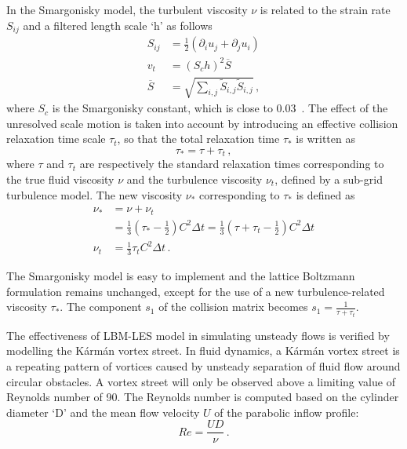 In the Smargonisky model, the turbulent viscosity $\nu$ is related to the 
strain 
rate $S_{ij}$ and a filtered length scale `h' as follows
%
\begin{align}
S_{ij} & = \frac{1}{2}(\partial_i u_j + \partial_j u_i) \\
\mathit{v}_{\mathit{t}} & = (\mathit{S}_{c}\mathit{h})^{2}\overline{S} \\
\overline{S} & =  
\sqrt{\sum\limits_{\mathit{i,j}}{\tilde{S}_{\mathit{i,j}}\tilde{S}_{\mathit{i,j}}}}\,,
\end{align}
%
\noindent where $\mathit{S}_{c}$ is the Smargonisky constant, which is close 
to 0.03~\citep{yu2005}. 
%
The effect of the unresolved scale motion is taken into account by introducing 
an effective collision relaxation time scale $\tau_{t}$, so that the total 
relaxation time $\tau_{*}$ is written as
%
\begin{equation}
\tau_{*}=\tau + \tau_{t}\,,
\end{equation} 
%
\noindent where $\tau$ and $\tau_{t}$ are respectively the standard relaxation 
times 
corresponding to the true fluid viscosity $\nu$ and the turbulence 
viscosity $\nu_{\mathit{t}}$, defined by a sub-grid turbulence model. 
The new viscosity $\nu_{*}$ corresponding to $\tau_{*}$ is defined as
%
\begin{align}
\nu_{*} & 
=\nu+\nu_{\mathit{t}} \nonumber \\
	& =\frac{1}{3}(\tau_{*}-\frac{1}{2})
\mathit{C}^{2} \Delta \mathit{t} 
=\frac{1}{3}(\tau+\tau_{t}-\frac{1}{2})\mathit{C}^{2} \Delta \mathit{t}  \\
\nu_{\mathit{t}} & =\frac{1}{3}\tau_{\mathit{t}}\mathit{C}^{2} \Delta 
\textit{t} \,.
\end{align} 

The Smargonisky model is easy to implement and the lattice Boltzmann 
formulation remains unchanged, except for the use of a new turbulence-related 
viscosity $\tau_{*}$. The component $s_1$ of the collision matrix becomes $s_1 
= \frac{1}{\tau+\tau_t}$.

The effectiveness of LBM-LES model in simulating unsteady flows is verified by 
modelling the K\'{a}rm\'{a}n vortex street. In fluid dynamics, a K\'{a}rm\'{a}n 
vortex street is a repeating pattern of vortices caused by unsteady separation 
of fluid flow around circular obstacles. A vortex street will only be observed 
above a limiting value of Reynolds number of 90. The Reynolds number 
is computed based on the cylinder diameter `D' and the mean flow velocity $U$ 
of the parabolic inflow profile:
%
\begin{equation}
\label{eq:reynolds}
Re=\frac{UD}{\nu}\,.
\end{equation}

